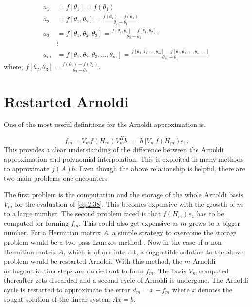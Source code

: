 \[
\begin{aligned}
    a_1 &= f[\theta_1] = f(\theta_1) \\
    a_2 &= f[\theta_1, \theta_2] = \frac{f(\theta_2) - f(\theta_1)}{\theta_2 - \theta_1} \\
    a_3 &= f[\theta_1, \theta_2, \theta_3] = \frac{f[\theta_2, \theta_3] - f[\theta_1, \theta_2]}{\theta_3 - \theta_1} \\
    &\vdots \\
    a_m &= f[\theta_1, \theta_2, \theta_3, \ldots, \theta_m] = \frac{f[\theta_2, \theta_3, \ldots, \theta_m] - f[\theta_1, \theta_2, \ldots, \theta_{m-1}]}{\theta_m - \theta_1}
\end{aligned}
\]
where, $f[\theta_2, \theta_3]=\frac{f(\theta_3) - f(\theta_2)}{\theta_3 - \theta_2}$.

\section{Restarted Arnoldi}
\label{sec:restarted_arnoldi}

One of the most useful definitions for the Arnoldi approximation is,

\begin{equation}
    f_{m} = V_{m}f(H_{m})V_m^{H}b = ||b||V_{m}f(H_{m})e_{1}.
    \label{eq:2.38}
\end{equation}
This provides a clear understanding of the difference between the Arnoldi approximation and polynomial interpolation. This is exploited in many methods to approximate $f(A)b$. Even though the above relationship is helpful, there are two main problems one encounters. 

The first problem is the computation and the storage of the whole Arnoldi basis $V_{m}$ for the evaluation of \eqref{eq:2.38}. This becomes expensive with the growth of $m$ to a large number. The second problem faced is that $f(H_{m})e_{1}$ has to be computed for forming $f_{m}$. This could also get expensive as $m$ grows to a bigger number. For a Hermitian matrix $A$, a simple strategy to overcome the storage problem would be a two-pass Lanczos method \cite{48}. Now in the case of a non-Hermitian matrix $A$, which is of our interest, a suggestible solution to the above problem would be restarted Arnoldi. With this method, the $m$ Arnoldi orthogonalization steps are carried out to form $f_{m}$. The basis $V_{m}$ computed thereafter gets discarded and a second cycle of Arnoldi is undergone. The Arnoldi cycle is restarted to approximate the error $d_{m}=x-f_{m}$ where $x$ denotes the sought solution of the linear system $Ax=b$.

